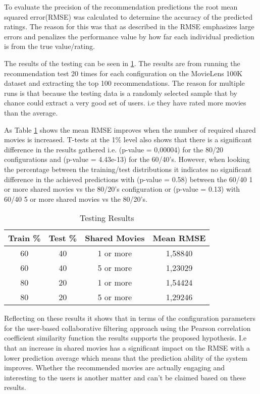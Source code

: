 To evaluate the precision of the recommendation predictions the root mean squared error(RMSE) was calculated to determine the accuracy of the predicted ratings. The reason for this was that as described in \cite{Schafer2007} the RMSE emphasizes large errors and penalizes the performance value by how far each individual prediction is from the true value/rating.

The results of the testing can be seen in \ref{table:results}. The results are from running the recommendation test 20 times for each configuration on the MovieLens 100K dataset and extracting the top 100 recommendations. The reason for multiple runs is that because the testing data is a randomly selected sample that by chance could extract a very good set of users. i.e they have rated more movies than the average.

As Table \ref{table:results} shows the mean RMSE improves when the number of required shared movies is increased. T-tests at the 1\% level also shows that there is a significant difference in the results gathered i.e. (p-value = 0,00004) for the 80/20 configurations and (p-value = 4.43e-13) for the 60/40's. However, when looking the percentage between the training/test distributions it indicates no significant difference in the achieved predictions with (p-value = 0.58) between the 60/40 1 or more shared movies vs the 80/20's configuration or (p-value = 0.13) with 60/40 5 or more shared movies vs the 80/20's.

\begin{table}[H]
	\caption{\label{table} Testing Results}
	\centering
	\label{table:results}
	\begin{tabular}{c c c c}
		\hline
		Train \% & Test \% & Shared Movies & Mean RMSE  \\
		\hline
		60 & 40 & 1 or more &  1,58840 \\
		60 & 40 & 5 or more &  1,23029 \\
		80 & 20 & 1 or more &  1,54424 \\
		80 & 20 & 5 or more &  1,29246 \\
		\hline
	\end{tabular}
\end{table} 

Reflecting on these results it shows that in terms of the configuration parameters for the user-based collaborative filtering approach using the Pearson correlation coefficient similarity function the results supports the proposed hypothesis. I.e that an increase in shared movies has a significant impact on the RMSE with a lower prediction average which means that the prediction ability of the system improves. Whether the recommended movies are actually engaging and interesting to the users is another matter and can't be claimed based on these results.

